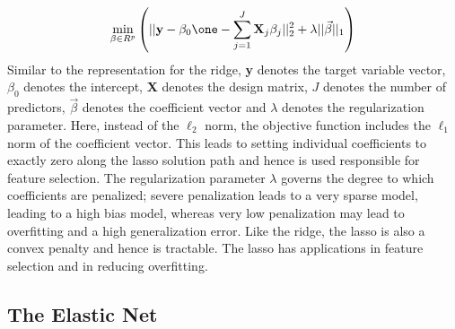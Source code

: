 \documentclass[a4paper,12pt]{article}
\begin{document}
\begin{eqnarray}
\label{eq:6}
\min_{\beta\in R^p}\left(|| \textbf{y}-\beta_0\one-\sum_{j=1}^J
\textbf{X}_j\beta_j||_2^2 + \lambda ||\vec{\beta}||_1 \right)
\end{eqnarray}
Similar to the representation for the ridge, \textbf{y} denotes the target variable vector, $\beta_0$ denotes the intercept, \textbf{X} denotes the design matrix, $J$ denotes the number of predictors, $\vec{\beta}$ denotes the coefficient vector and $\lambda$ denotes the regularization parameter. Here, instead of the $\ell_2$ norm, the objective function includes the $\ell_1$ norm of the coefficient vector. This leads to setting individual coefficients to exactly zero along the lasso solution path and hence is used responsible for feature selection. The regularization parameter $\lambda$ governs the degree to which coefficients are penalized; severe penalization leads to a very sparse model, leading to a high bias model, whereas very low penalization may lead to overfitting and a high generalization error. Like the ridge, the lasso is also a convex penalty and hence is tractable. The lasso has applications in feature selection and in reducing overfitting. 



\newpage
\subsection{The Elastic Net}
\end{document}

